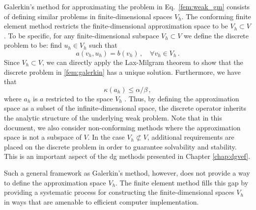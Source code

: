 \documentclass[../doc.tex]{subfiles}
\begin{document}
Galerkin's method for approximating the problem in Eq.~\ref{fem:weak_gm} consists of defining similar problems in finite-dimensional spaces $V_h$. The conforming finite element method restricts the finite-dimensional approximation space to be $V_h \subset V$. To be specific, for any finite-dimensional subspace $V_h\subset V$ we define the discrete problem to be: find $u_h \in V_h$ such that 
	\begin{equation} \label{fem:galerkin}
	 	a(v_h,u_h) = b(v_h) \,, \quad \forall v_h \in V_h \,. 
	\end{equation} 
Since $V_h \subset V$, we can directly apply the Lax-Milgram theorem to show that the discrete problem in \ref{fem:galerkin} has a unique solution. Furthermore, we have that 
	\begin{equation}
		\kappa(a_h) \leq \alpha/\beta \,, 
	\end{equation}
where $a_h$ is $a$ restricted to the space $V_h$ \cite[Corollary 2.4]{la2fa}. Thus, by defining the approximation space as a subset of the infinite-dimensional space, the discrete operator inherits the analytic structure of the underlying weak problem. 
Note that in this document, we also consider non-conforming methods where the approximation space is not a subspace of $V$. In the case $V_h \not\subset V$, additional requirements are placed on the discrete problem in order to guarantee solvability and stability. This is an important aspect of the \gls{dg} methods presented in Chapter \ref{chap:dgvef}. 

Such a general framework as Galerkin's method, however, does not provide a way to define the approximation space $V_h$. The finite element method fills this gap by providing a systematic process for constructing the finite-dimensional spaces $V_h$ in ways that are amenable to efficient computer implementation. 
\end{document}
